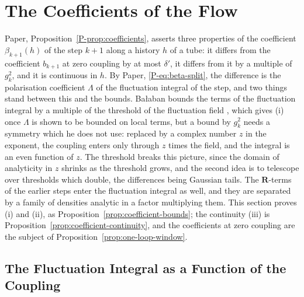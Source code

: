 \documentclass[11pt]{preprint}
\numberwithin{equation}{section}
\theoremstyle{definition}
\theoremstyle{remark}
\theoremstyle{plain}
\begin{document}
\section{The Coefficients of the Flow}\label{sec:coefficients}

Paper, Proposition~\ref{P-prop:coefficients}, asserts three properties of the coefficient $\beta_{k+1}(h)$ of the step $k + 1$ along a history $h$ of a tube: it differs from the coefficient $b_{k+1}$ at zero coupling by at most $\delta'$, it differs from it by a multiple of $g_k^2$, and it is continuous in $h$. By Paper, \eqref{P-eq:beta-split}, the difference is the polarisation coefficient $\Lambda$ of the fluctuation integral of the step, and two things stand between this and the bounds. Ba{\l}aban bounds the terms of the fluctuation integral by a multiple of the threshold of the fluctuation field \cite[(2.41), p.~21]{BalabanRG2}, which gives (i) once $\Lambda$ is shown to be bounded on local terms, but a bound by $g_k^2$ needs a symmetry which he does not use: replaced by a complex number $z$ in the exponent, the coupling enters only through $z$ times the field, and the integral is an even function of $z$. The threshold breaks this picture, since the domain of analyticity in $z$ shrinks as the threshold grows, and the second idea is to telescope over thresholds which double, the differences being Gaussian tails. The $\mathbf R$-terms of the earlier steps enter the fluctuation integral as well, and they are separated by a family of densities analytic in a factor multiplying them. This section proves (i) and (ii), as Proposition~\ref{prop:coefficient-bounds}; the continuity (iii) is Proposition~\ref{prop:coefficient-continuity}, and the coefficients at zero coupling are the subject of Proposition~\ref{prop:one-loop-window}.

\subsection{The Fluctuation Integral as a Function of the Coupling}\label{sec:fluctuation-integral}
\end{document}
